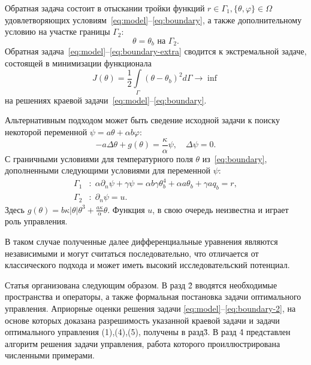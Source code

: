 Обратная задача состоит в отыскании тройки функций $r \in  \Gamma_1, \{\theta, \varphi\} \in \Omega $
удовлетворяющих условиям~\eqref{eq:model}--\eqref{eq:boundary}, а также дополнительному условию
на участке границы $\Gamma_2$:
\begin{equation}
    \label{eq:boundary-extra}
    \theta = \theta_b \text{ на } \Gamma_2.
\end{equation}
Обратная задача~\eqref{eq:model}--\eqref{eq:boundary-extra} сводится к экстремальной задаче,
состоящей в минимизации функционала
\begin{equation}
    \label{eq:cost}
    J(\theta) = \frac{1}{2}\int\limits_\Gamma (\theta - \theta_b)^{2} d\Gamma \rightarrow \inf
\end{equation}
на решениях краевой задачи~\eqref{eq:model}--\eqref{eq:boundary}.


Альтернативным подходом может быть сведение исходной задачи к поиску некоторой
переменной $\psi = a\theta + \alpha b \varphi$:
\begin{equation}
    \label{eq:equation}
    - a \Delta \theta + g (\theta) = \frac{\kappa}{\alpha}\psi, \quad
    \Delta \psi = 0.
\end{equation}
С граничными условиями для температурного поля $\theta$ из~\eqref{eq:boundary},
дополненными следующими условиями для переменной $\psi$:
\begin{equation}
    \label{eq:boundary-2}
    \begin{aligned}
        \Gamma_1 &: \; \alpha \partial_n \psi + \gamma \psi = \alpha b \gamma \theta_b^4
        + \alpha a \theta_b + \gamma a q_b = r, \\
        \Gamma_2 &: \; \partial_n \psi = u.
    \end{aligned}
\end{equation}
Здесь $g(\theta) = b \kappa|\theta|\theta^3 + \frac{a\kappa}{\alpha}\theta$.
Функция $u$, в свою очередь неизвестна и играет роль управления.

В таком случае полученные далее дифференциальные уравнения являются независимыми и
могут считаться последовательно,
что отличается от классического подхода и может иметь высокий исследовательский потенциал.

Статья организована следующим образом.
В разд \. 2 вводятся необходимые пространства и операторы,
а также формальная постановка задачи оптимального управления.
Априорные оценки решения задачи \eqref{eq:model}--\eqref{eq:boundary-2}, на основе которых доказана разрешимость
указанной краевой задачи и задачи оптимального управления (1),(4),(5), получены в разд\. 3.
В разд \. 4 представлен алгоритм решения задачи управления, работа которого
проиллюстрирована численными примерами.
